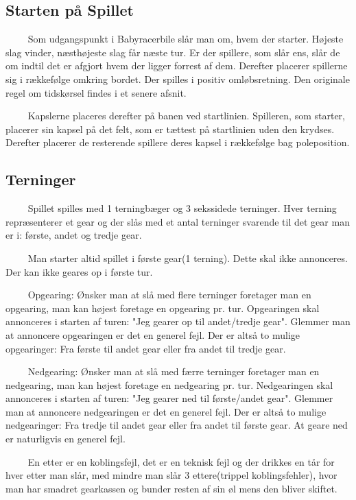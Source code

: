 \documentclass[12pt]{article}
\begin{document}
\subsection*{Starten på Spillet}

$\qquad$ Som udgangspunkt i Babyracerbile slår man om, hvem der starter. Højeste slag vinder, næsthøjeste slag får næste tur. Er der spillere, som slår ens, slår de om indtil det er afgjort hvem der ligger forrest af dem. Derefter placerer spillerne sig i rækkefølge omkring bordet. Der spilles i positiv omløbsretning. Den originale regel om tidskørsel findes i et senere afsnit.

$\qquad$ Kapslerne placeres derefter på banen ved startlinien. Spilleren, som starter, placerer sin kapsel på det felt, som er tættest på startlinien uden den krydses. Derefter placerer de resterende spillere deres kapsel i rækkefølge bag poleposition.


\subsection*{Terninger}

$\qquad$ Spillet spilles med 1 terningbæger og 3 sekssidede terninger. Hver terning repræsenterer et gear og der slås med et antal terninger svarende til det gear man er i: første, andet og tredje gear.

$\qquad$ Man starter altid spillet i første gear(1 terning). Dette skal ikke annonceres. Der kan ikke geares op i første tur.

$\qquad$ Opgearing: Ønsker man at slå med flere terninger foretager man en opgearing, man kan højest foretage en opgearing pr. tur. Opgearingen skal annonceres i starten af turen: "Jeg gearer op til andet/tredje gear". Glemmer man at annoncere opgearingen er det en generel fejl. Der er altså to mulige opgearinger: Fra første til andet gear eller fra andet til tredje gear.

$\qquad$ Nedgearing: Ønsker man at slå med færre terninger foretager man en nedgearing, man kan højest foretage en nedgearing pr. tur. Nedgearingen skal annonceres i starten af turen: "Jeg gearer ned til første/andet gear". Glemmer man at annoncere nedgearingen er det en generel fejl. Der er altså to mulige nedgearinger: Fra tredje til andet gear eller fra andet til første gear. At geare ned er naturligvis en generel fejl.

$\qquad$ En etter er en koblingsfejl, det er en teknisk fejl og der drikkes en tår for hver etter man slår, med mindre man slår 3 ettere(trippel koblingsfehler), hvor man har smadret gearkassen og bunder resten af sin øl mens den bliver skiftet.
\end{document}
